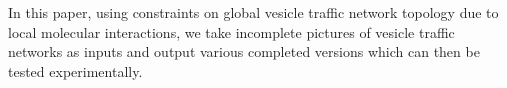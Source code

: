 In this paper, using constraints on global vesicle traffic network topology due to local molecular interactions, we take incomplete pictures of vesicle traffic networks as inputs and output various completed versions which can then be tested experimentally.
%



